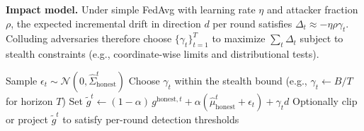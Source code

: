 \documentclass[lettersize,journal]{IEEEtran}
\begin{document}
\textbf{Impact model.} Under simple FedAvg with learning rate $\eta$ and attacker fraction $\rho$, the expected incremental drift in direction $d$ per round satisfies $\Delta_t \approx -\eta\rho\gamma_t$. Colluding adversaries therefore choose $\{\gamma_t\}_{t=1}^T$ to maximize $\sum_t \Delta_t$ subject to stealth constraints (e.g., coordinate-wise limits and distributional tests).

\begin{algorithm}[h]
\caption{Statistical Mimicry (SM): per-client routine}
\label{alg:sm}
\DontPrintSemicolon
{}
Sample $\epsilon_t \sim \mathcal{N}(0,\hat{\Sigma}_{\mathrm{honest}}^t)$\;
Choose $\gamma_t$ within the stealth bound (e.g., $\gamma_t\leftarrow B/T$ for horizon $T$)\;
Set $\tilde{g}^t \leftarrow (1-\alpha)\,g^{\mathrm{honest},t} + \alpha(\hat{\mu}_{\mathrm{honest}}^t+\epsilon_t) + \gamma_t d$\;
Optionally clip or project $\tilde{g}^t$ to satisfy per-round detection thresholds\;
\end{algorithm}
\end{document}
